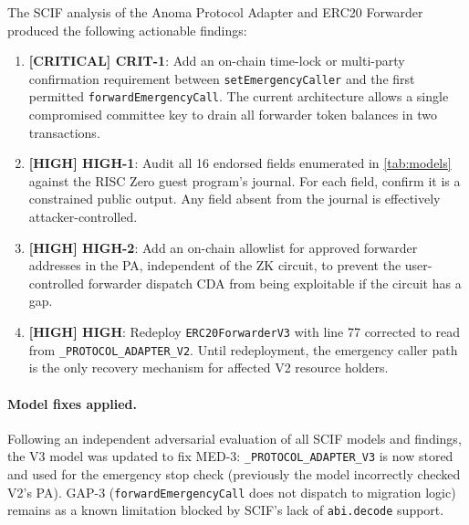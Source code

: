 \documentclass[11pt,a4paper]{article}
\newcommand{\sevCrit}[1]{\textcolor{critred}{\textbf{[CRITICAL] #1}}}
\newcommand{\sevHigh}[1]{\textcolor{highred}{\textbf{[HIGH] #1}}}
\begin{document}
The SCIF analysis of the Anoma Protocol Adapter and ERC20 Forwarder produced
the following actionable findings:

\begin{enumerate}
  \item \sevCrit{CRIT-1}: Add an on-chain time-lock or multi-party confirmation
    requirement between \texttt{setEmergencyCaller} and the first permitted
    \texttt{forwardEmergencyCall}. The current architecture allows a single
    compromised committee key to drain all forwarder token balances in two
    transactions.

  \item \sevHigh{HIGH-1}: Audit all 16 endorsed fields enumerated in
    \cref{tab:models} against the RISC Zero guest program's journal. For each
    field, confirm it is a constrained public output. Any field absent from
    the journal is effectively attacker-controlled.

  \item \sevHigh{HIGH-2}: Add an on-chain allowlist for approved forwarder
    addresses in the PA, independent of the ZK circuit, to prevent the
    user-controlled forwarder dispatch CDA from being exploitable if the circuit
    has a gap.

  \item \sevHigh{HIGH}: Redeploy \texttt{ERC20ForwarderV3} with line 77
    corrected to read from \texttt{\_PROTOCOL\_ADAPTER\_V2}. Until redeployment,
    the emergency caller path is the only recovery mechanism for affected V2
    resource holders.
\end{enumerate}

\paragraph{Model fixes applied.} Following an independent adversarial
evaluation of all SCIF models and findings, the V3 model was updated to fix
MED-3: \texttt{\_PROTOCOL\_ADAPTER\_V3} is now stored and used for the emergency
stop check (previously the model incorrectly checked V2's PA). GAP-3
(\texttt{forwardEmergencyCall} does not dispatch to migration logic) remains as
a known limitation blocked by SCIF's lack of \texttt{abi.decode} support.
\end{document}
